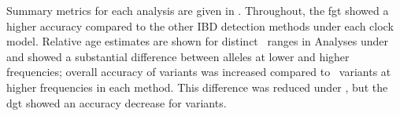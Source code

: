 Summary metrics for each analysis are given in .
Throughout, the \gls{fgt} showed a higher accuracy compared to the other IBD detection methods under each clock model.
Relative age estimates are shown for distinct \fk{}~ranges in 
Analyses under \ClockM and \ClockC showed a substantial difference between alleles at lower and higher frequencies; \eg overall accuracy of \fk{[2,5]} variants was increased compared to \fk{}~variants at higher frequencies in each method.
This difference was reduced under \ClockR, but the \gls{dgt} showed an accuracy decrease for \fk{[2,5]} variants.

%

%


% 
%



